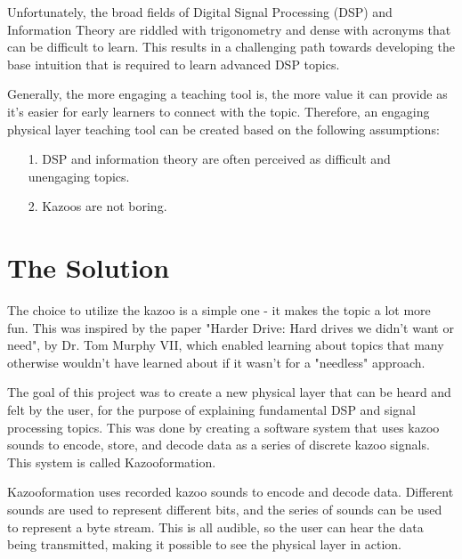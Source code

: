 \documentclass[]{article}
\begin{document}
Unfortunately, the broad fields of Digital Signal Processing (DSP) and Information Theory are riddled with trigonometry and dense with acronyms that can be difficult to learn. This results in a challenging path towards developing the base intuition that is required to learn advanced DSP topics.

Generally, the more engaging a teaching tool is, the more value it can provide as it's easier for early learners to connect with the topic. Therefore, an engaging physical layer teaching tool can be created based on the following assumptions:

\begin{itemize}
  \item[1.] DSP and information theory are often perceived as difficult and unengaging topics.
  \item[2.] Kazoos are not boring.
\end{itemize}

\section{The Solution}



The choice to utilize the kazoo is a simple one - it makes the topic a lot more fun. This was inspired by the paper "Harder Drive: Hard drives we didn't want or need", by Dr. Tom Murphy VII, which enabled learning about topics that many otherwise wouldn't have learned about if it wasn't for a "needless"\cite{murphy2022harder} approach.

The goal of this project was to create a new physical layer that can be heard and felt by the user, for the purpose of explaining fundamental DSP and signal processing topics. This was done by creating a software system that uses kazoo sounds to encode, store, and decode data as a series of discrete kazoo signals. This system is called Kazooformation.

Kazooformation uses recorded kazoo sounds to encode and decode data. Different
sounds are used to represent different bits, and the series of sounds can be
used to represent a byte stream. This is all audible, so the user can hear the
data being transmitted, making it possible to see the physical layer in action.
\end{document}
